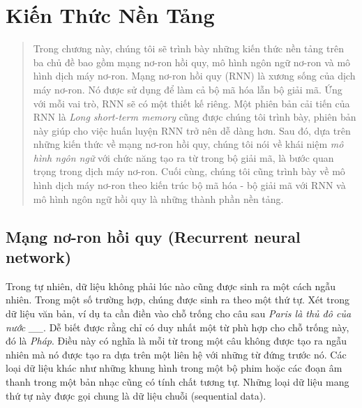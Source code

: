 \chapter{Kiến Thức Nền Tảng}
\ifpdf
    \graphicspath{{Chapter2/Chapter2Figs/PNG/}{Chapter2/Chapter2Figs/PDF/}{Chapter2/Chapter2Figs/}}
\else
    \graphicspath{{Chapter2/Chapter2Figs/EPS/}{Chapter2/Chapter2Figs/}}
\fi

\begin{quote}


Trong chương này, chúng tôi sẽ trình bày những kiến thức nền tảng trên ba chủ đề bao gồm mạng nơ-ron hồi quy, mô hình ngôn ngữ nơ-ron và mô hình dịch máy nơ-ron. Mạng nơ-ron hồi quy (RNN) là xương sống của dịch máy nơ-ron. Nó được sử dụng để làm cả bộ mã hóa lẫn bộ giải mã. Ứng với mỗi vai trò, RNN sẽ có một thiết kế riêng. Một phiên bản cải tiến của RNN là \textit{Long short-term memory} cũng được chúng tôi trình bày, phiên bản này giúp cho việc huấn luyện RNN trở nên dễ dàng hơn. Sau đó, dựa trên những kiến thức về mạng nơ-ron hồi quy, chúng tôi nói về khái niệm \textit{mô hình ngôn ngữ} với chức năng tạo ra từ trong bộ giải mã, là bước quan trọng trong dịch máy nơ-ron. Cuối cùng, chúng tôi cũng trình bày về mô hình dịch máy nơ-ron theo kiến trúc bộ mã hóa - bộ giải mã với RNN và mô hình ngôn ngữ hồi quy là những thành phần nền tảng.

\end{quote}
\section{Mạng nơ-ron hồi quy (Recurrent neural network)}

Trong tự nhiên, dữ liệu không phải lúc nào cũng được sinh ra một cách ngẫu nhiên. Trong một số trường hợp, chúng được sinh ra theo một thứ tự. Xét trong dữ liệu văn bản, ví dụ ta cần điền vào chỗ trống cho câu sau \textit{Paris là thủ đô của nước \_\_}. Dễ biết được rằng chỉ có duy nhất một từ phù hợp cho chỗ trống này, đó là \textit{Pháp}. Điều này có nghĩa là mỗi từ trong một câu không được tạo ra ngẫu nhiên mà nó được tạo ra dựa trên một liên hệ với những từ đứng trước nó. Các loại dữ liệu khác như những khung hình trong một bộ phim hoặc các đoạn âm thanh trong một bản nhạc cũng có tính chất tương tự. Những loại dữ liệu mang thứ tự này được gọi chung là dữ liệu chuỗi (sequential data).

